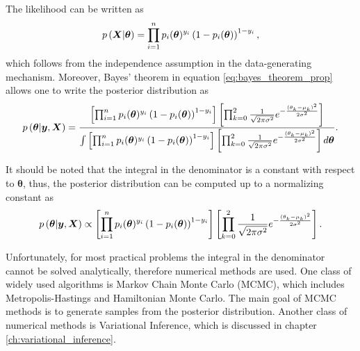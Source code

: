 The likelihood can be written as
\begin{equation}
  p\left( \boldsymbol{X} | \boldsymbol{\theta} \right) = \prod_{i = 1}^n  p_i(\boldsymbol{\theta})^{y_i}\left(1 - p_i(\boldsymbol{\theta}) \right)^{1 - y_i},
\end{equation}
which follows from the independence assumption in the data-generating mechanism. Moreover, Bayes' theorem in equation \eqref{eq:bayes_theorem_prop} allows one to write the posterior distribution as
\begin{equation}
  p\left( \boldsymbol{\theta} | \boldsymbol{y}, \boldsymbol{X} \right) =
    \frac
    {
      \left[ \prod_{i = 1}^n  p_i(\boldsymbol{\theta})^{y_i}\left(1 - p_i(\boldsymbol{\theta}) \right)^{1 - y_i} \right]
      \left[ \prod_{k = 0}^2 \frac{1}{\sqrt{2 \pi \sigma^2}} e^{- \frac{(\theta_k - \mu_k)^2}{2\sigma^2}} \right]
    }{
      \int \left[ \prod_{i = 1}^n  p_i(\boldsymbol{\theta})^{y_i}\left(1 - p_i(\boldsymbol{\theta}) \right)^{1 - y_i} \right]
      \left[ \prod_{k = 0}^2 \frac{1}{\sqrt{2 \pi \sigma^2}} e^{- \frac{(\theta_k - \mu_k)^2}{2\sigma^2}} \right] d\boldsymbol{\theta}
    }.
\end{equation}

It should be noted that the integral in the denominator is a constant with respect to $\boldsymbol{\theta}$, thus, the posterior distribution can be computed up to a normalizing constant as
\begin{equation}
  p\left( \boldsymbol{\theta} | \boldsymbol{y}, \boldsymbol{X} \right) \propto
  \left[ \prod_{i = 1}^n  p_i(\boldsymbol{\theta})^{y_i}\left(1 - p_i(\boldsymbol{\theta}) \right)^{1 - y_i} \right]
  \left[ \prod_{k = 0}^2 \frac{1}{\sqrt{2 \pi \sigma^2}} e^{- \frac{(\theta_k - \mu_k)^2}{2\sigma^2}} \right].
\end{equation}

Unfortunately, for most practical problems the integral in the denominator cannot be solved analytically, therefore numerical methods are used. One class of widely used algorithms is Markov Chain Monte Carlo (MCMC), which includes Metropolis-Hastings and Hamiltonian Monte Carlo. The main goal of MCMC methods is to generate samples from the posterior distribution. Another class of numerical methods is Variational Inference, which is discussed in chapter \ref{ch:variational_inference}.


